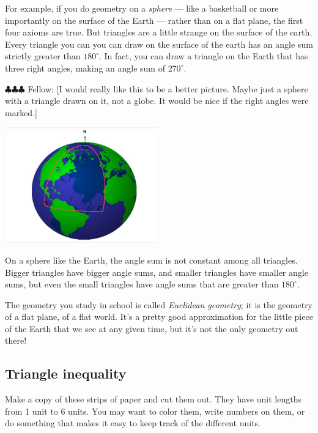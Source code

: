 \documentclass[12pt, reqno]{amsart}
\theoremstyle{remark}
\theoremstyle{definition}
\numberwithin{equation}{section}  %
\newcommand{\fellow}[1]{{\color{magenta} \sf $\clubsuit\clubsuit\clubsuit$ Fellow: [#1]}}
\begin{document}
For example, if you do geometry on a \emph{sphere} --- like a basketball or more importantly on the surface of the Earth --- rather than on a flat plane, the first four axioms are true.  But  triangles are a little strange on the surface of the earth.  Every triangle you can you can draw on the surface of the earth has an angle sum strictly greater than $180^\circ$.     In fact, you can draw a triangle on the Earth that has three right angles, making an angle sum of $270^\circ$.  

\fellow{I would really like this to be a better picture.  Maybe just a sphere with a triangle drawn on it, not a globe.  It would be nice if the right angles were marked.}

\begin{center}
\includegraphics[height=5cm]{earthtri}
\end{center}
On a sphere like the Earth, the angle sum is not constant among all triangles.  Bigger triangles have bigger angle sums, and smaller triangles have smaller angle sums, but even the small triangles have angle sums that are greater than $180^\circ$.


The geometry you study in school is called \emph{Euclidean geometry}; it is the geometry of a flat plane, of a flat world.  It's a pretty good approximation for the little piece of the Earth that we see at any given time, but it's not the only geometry out there!


\newpage

\subsection{Triangle inequality}
Make a copy of these strips of paper and cut them out.  They have unit lengths from 1 unit to 6 units.  You may want to color them, write numbers on them, or do something that makes it easy to keep track of the different units.
\end{document}
